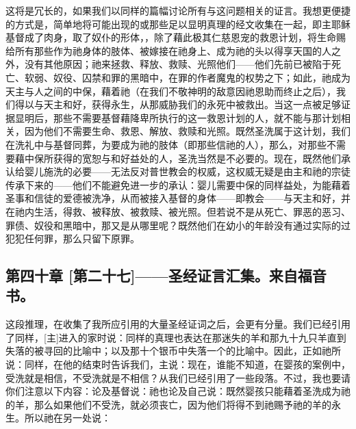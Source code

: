 这将是冗长的，如果我们以同样的篇幅讨论所有与这问题相关的证言。我想更便捷的方式是，简单地将可能出现的或那些足以显明真理的经文收集在一起，即主耶稣基督成了肉身，取了奴仆的形体，，除了藉此极其仁慈恩宠的救恩计划，将生命赐给所有那些作为祂身体的肢体、被嫁接在祂身上、成为祂的头以得享天国的人之外，没有其他原因；祂来拯救、释放、救赎、光照他们——他们先前已被陷于死亡、软弱、奴役、囚禁和罪的黑暗中，在罪的作者魔鬼的权势之下；如此，祂成为天主与人之间的中保，藉着祂（在我们不敬神明的敌意因祂恩助而终止之后），我们得以与天主和好，获得永生，从那威胁我们的永死中被救出。当这一点被足够证据显明后，那些不需要基督藉降卑所执行的这一救恩计划的人，就不能与那计划相关，因为他们不需要生命、救恩、解放、救赎和光照。既然圣洗属于这计划，我们在洗礼中与基督同葬，为要成为祂的肢体（即那些信祂的人），那么，对那些不需要藉中保所获得的宽恕与和好益处的人，圣洗当然是不必要的。现在，既然他们承认给婴儿施洗的必要——无法反对普世教会的权威，这权威无疑是由主和祂的宗徒传承下来的——他们不能避免进一步的承认：婴儿需要中保的同样益处，为能藉着圣事和信徒的爱德被洗净，从而被接入基督的身体——即教会——与天主和好，并在祂内生活，得救、被释放、被救赎、被光照。但若说不是从死亡、罪恶的恶习、罪债、奴役和黑暗中，那又是从哪里呢？既然他们在幼小的年龄没有通过实际的过犯犯任何罪，那么只留下原罪。\par


\subsection{第四十章 [第二十七]——圣经证言汇集。来自福音书。}

这段推理，在收集了我所应引用的大量圣经证词之后，会更有分量。我们已经引用了同样，[主]进入的家时说：同样的真理也表达在那迷失的羊和那九十九只羊直到失落的被寻回的比喻中；以及那十个银币中失落一个的比喻中。因此，正如祂所说：同样，在他的结束时告诉我们，主说：现在，谁能不知道，在婴孩的案例中，受洗就是相信，不受洗就是不相信？从我们已经引用了一些段落。不过，我也要请你们注意以下内容：论及基督说：祂也论及自己说：既然婴孩只能藉着圣洗成为祂的羊，那么如果他们不受洗，就必须丧亡，因为他们将得不到祂赐予祂的羊的永生。所以祂在另一处说：\par

